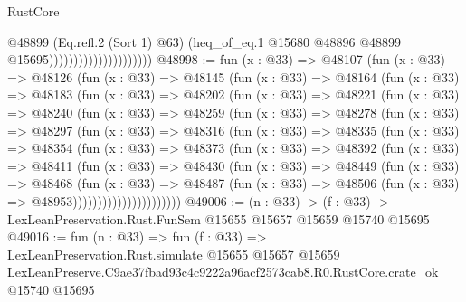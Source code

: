\begin{lexlean}{RustCore}
\begin{coremodule}
                                            @48899
                                            (Eq.refl.{2} (Sort 1) @63)
                                            (heq_of_eq.{1}
                                              @15680
                                              @48896
                                              @48899
                                              @15695)))))))))))))))))))))
@48998 := fun (x : @33) =>
  @48107
    (fun (x : @33) =>
    @48126
      (fun (x : @33) =>
      @48145
        (fun (x : @33) =>
        @48164
          (fun (x : @33) =>
          @48183
            (fun (x : @33) =>
            @48202
              (fun (x : @33) =>
              @48221
                (fun (x : @33) =>
                @48240
                  (fun (x : @33) =>
                  @48259
                    (fun (x : @33) =>
                    @48278
                      (fun (x : @33) =>
                      @48297
                        (fun (x : @33) =>
                        @48316
                          (fun (x : @33) =>
                          @48335
                            (fun (x : @33) =>
                            @48354
                              (fun (x : @33) =>
                              @48373
                                (fun (x : @33) =>
                                @48392
                                  (fun (x : @33) =>
                                  @48411
                                    (fun (x : @33) =>
                                    @48430
                                      (fun (x : @33) =>
                                      @48449
                                        (fun (x : @33) =>
                                        @48468
                                          (fun (x : @33) =>
                                          @48487
                                            (fun (x : @33) =>
                                            @48506 (fun (x : @33) => @48953))))))))))))))))))))))
@49006 := (n : @33) ->
  (f : @33) -> LexLeanPreservation.Rust.FunSem @15655 @15657 @15659 @15740 @15695
@49016 := fun (n : @33) =>
  fun (f : @33) =>
  LexLeanPreservation.Rust.simulate
    @15655
    @15657
    @15659
    LexLeanPreserve.C9ae37fbad93c4c9222a96acf2573cab8.R0.RustCore.crate_ok
    @15740
    @15695
\end{coremodule}
\end{lexlean}

